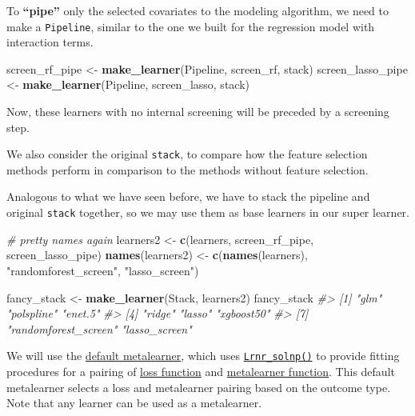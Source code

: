 \documentclass[12pt, krantz2,]{krantz}
\newenvironment{Shaded}{\begin{snugshade}}{\end{snugshade}}
\newcommand{\CommentTok}[1]{\textcolor[rgb]{0.37,0.37,0.37}{\textit{#1}}}
\newcommand{\KeywordTok}[1]{\textcolor[rgb]{0.27,0.27,0.27}{\textbf{#1}}}
\newcommand{\NormalTok}[1]{#1}
\newcommand{\StringTok}[1]{\textcolor[rgb]{0.5,0.5,0.5}{#1}}
\theoremstyle{definition}
\theoremstyle{definition}
\theoremstyle{definition}
\newcommand{\1}{\mathbbm{1}}
\begin{document}
To \textbf{``pipe''} only the selected covariates to the modeling algorithm, we need to
make a \texttt{Pipeline}, similar to the one we built for the regression model with
interaction terms.

\begin{Shaded}
\begin{Highlighting}[]
\NormalTok{screen_rf_pipe <-}\StringTok{ }\KeywordTok{make_learner}\NormalTok{(Pipeline, screen_rf, stack)}
\NormalTok{screen_lasso_pipe <-}\StringTok{ }\KeywordTok{make_learner}\NormalTok{(Pipeline, screen_lasso, stack)}
\end{Highlighting}
\end{Shaded}

Now, these learners with no internal screening will be preceded by a screening
step.

We also consider the original \texttt{stack}, to compare how the feature selection
methods perform in comparison to the methods without feature selection.

Analogous to what we have seen before, we have to stack the pipeline and
original \texttt{stack} together, so we may use them as base learners in our super
learner.

\begin{Shaded}
\begin{Highlighting}[]
\CommentTok{# pretty names again}
\NormalTok{learners2 <-}\StringTok{ }\KeywordTok{c}\NormalTok{(learners, screen_rf_pipe, screen_lasso_pipe)}
\KeywordTok{names}\NormalTok{(learners2) <-}\StringTok{ }\KeywordTok{c}\NormalTok{(}\KeywordTok{names}\NormalTok{(learners), }\StringTok{"randomforest_screen"}\NormalTok{, }\StringTok{"lasso_screen"}\NormalTok{)}

\NormalTok{fancy_stack <-}\StringTok{ }\KeywordTok{make_learner}\NormalTok{(Stack, learners2)}
\NormalTok{fancy_stack}
\CommentTok{#> [1] "glm"                 "polspline"           "enet.5"             }
\CommentTok{#> [4] "ridge"               "lasso"               "xgboost50"          }
\CommentTok{#> [7] "randomforest_screen" "lasso_screen"}
\end{Highlighting}
\end{Shaded}

We will use the \href{https://tlverse.org/sl3/reference/default_metalearner.html}{default
metalearner}, which
uses \href{https://tlverse.org/sl3/reference/Lrnr_solnp.html}{\texttt{Lrnr\_solnp()}} to
provide fitting procedures for a pairing of \href{https://tlverse.org/sl3/reference/loss_functions.html}{loss
function} and
\href{https://tlverse.org/sl3/reference/metalearners.html}{metalearner function}.
This default metalearner selects a loss and metalearner pairing based on the
outcome type. Note that any learner can be used as a metalearner.
\end{document}
